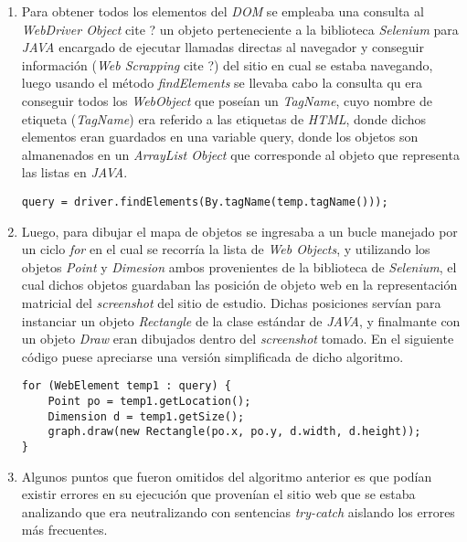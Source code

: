         \begin{enumerate}
         \item Para obtener todos los elementos del \textit{DOM} se empleaba una consulta al 
         \textit{WebDriver Object} cite ? un objeto perteneciente a la biblioteca \textit{Selenium} 	
         para
         \textit{JAVA} encargado de ejecutar llamadas directas al navegador y conseguir información
         (\textit{Web Scrapping} cite ?) del sitio en cual se estaba navegando, luego usando el 
         método \textit{findElements} se llevaba cabo la consulta qu era conseguir todos los 
         \textit{WebObject} que poseían un \textit{TagName}, cuyo nombre de etiqueta 
         (\textit{TagName}) era referido a las etiquetas de \textit{HTML}, donde dichos elementos
         eran guardados en una variable query, donde los objetos son almanenados en un 
         \textit{ArrayList Object} que corresponde al objeto que representa las listas en 
         \textit{JAVA}.
			\begin{lstlisting}[style=Java, caption={Obtención \textit{WebObjects}.}]
           	query = driver.findElements(By.tagName(temp.tagName()));
\end{lstlisting}
		\item Luego, para dibujar el mapa de objetos se ingresaba a un bucle manejado por un ciclo
		\textit{for} en el cual se recorría la lista de \textit{Web Objects}, y utilizando los 
		objetos \textit{Point} y \textit{Dimesion} ambos provenientes de la biblioteca de 
		\textit{Selenium}, el cual dichos objetos guardaban las posición de objeto web 
		en la representación matricial del \textit{screenshot} del sitio de estudio. Dichas
		posiciones servían para instanciar un objeto \textit{Rectangle} de la clase estándar
		de \textit{JAVA}, y finalmante con un objeto \textit{Draw} eran dibujados dentro del 
		\textit{screenshot} tomado. En el siguiente código puese apreciarse una versión simplificada
		de dicho algoritmo.
					\begin{lstlisting}[style=Java, caption={Algoritmo mapa de objetos simplificado.}]
for (WebElement temp1 : query) {
	Point po = temp1.getLocation();
    Dimension d = temp1.getSize();
    graph.draw(new Rectangle(po.x, po.y, d.width, d.height));
}
\end{lstlisting}
		\item Algunos puntos que fueron omitidos del algoritmo anterior es que podían existir 
		errores en su ejecución que provenían el sitio web que se estaba analizando que era 
		neutralizando con sentencias \textit{try-catch} aislando los errores más frecuentes.

\end{enumerate}
